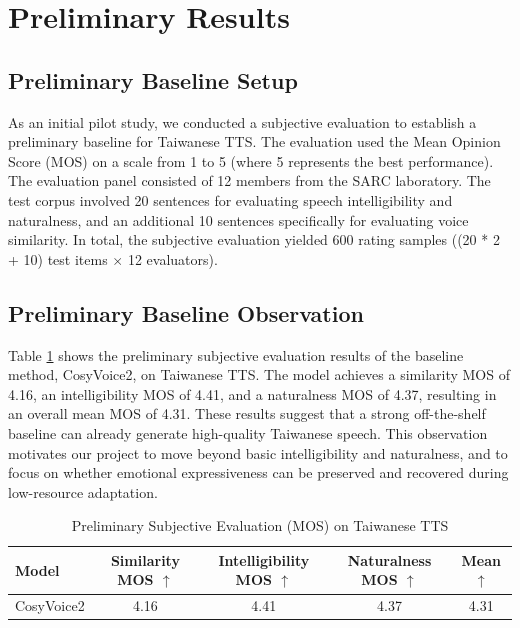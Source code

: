 \section{Preliminary Results}
\label{section:exp}

\subsection{Preliminary Baseline Setup}
\label{section:exp:setup}
As an initial pilot study, we conducted a subjective evaluation to establish a preliminary baseline for Taiwanese TTS. The evaluation used the Mean Opinion Score (MOS) on a scale from 1 to 5 (where 5 represents the best performance). The evaluation panel consisted of 12 members from the SARC laboratory. The test corpus involved 20 sentences for evaluating speech intelligibility and naturalness, and an additional 10 sentences specifically for evaluating voice similarity. In total, the subjective evaluation yielded 600 rating samples ((20 * 2 + 10) test items $\times$ 12 evaluators).

\subsection{Preliminary Baseline Observation}
\label{section:exp:baseline}

Table \ref{tab:taiwanese_mos} shows the preliminary subjective evaluation results of the baseline method, CosyVoice2, on Taiwanese TTS. The model achieves a similarity MOS of 4.16, an intelligibility MOS of 4.41, and a naturalness MOS of 4.37, resulting in an overall mean MOS of 4.31. These results suggest that a strong off-the-shelf baseline can already generate high-quality Taiwanese speech. This observation motivates our project to move beyond basic intelligibility and naturalness, and to focus on whether emotional expressiveness can be preserved and recovered during low-resource adaptation.

\begin{table}[htbp]
\centering
\caption{Preliminary Subjective Evaluation (MOS) on Taiwanese TTS}
\label{tab:taiwanese_mos}
\begin{tabular}{lcccc}
\toprule
\textbf{Model} & \textbf{Similarity MOS $\uparrow$} & \textbf{Intelligibility MOS $\uparrow$} & \textbf{Naturalness MOS $\uparrow$} & \textbf{Mean $\uparrow$} \\
\midrule
CosyVoice2 & 4.16 & 4.41 & 4.37 & 4.31 \\
\bottomrule
\end{tabular}
\end{table}
